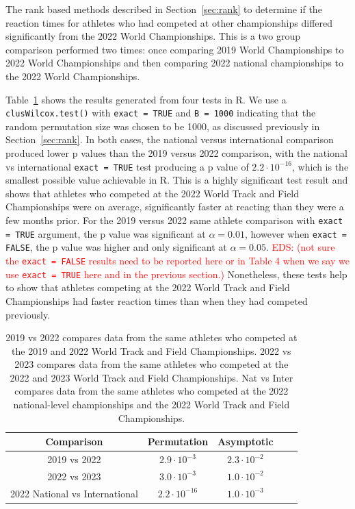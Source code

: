 \documentclass[12pt, letterpaper, titlepage]{article}
\newcommand{\eds}[1]{\textcolor{red}{EDS: (#1)}}
\begin{document}
The rank based methods described in Section~\ref{sec:rank}
to determine if the reaction times for athletes who had competed at other 
championships differed significantly from the 2022 World Championships.  This is
a two group comparison performed two times: once comparing 2019 World
Championships to 2022 World Championships and then comparing 2022 national
championships to the 2022 World Championships.



Table~\ref{tab:Clusrankresults} shows the results generated from four tests in R.
We use a \texttt{clusWilcox.test()} with \texttt{exact = TRUE} and 
\texttt{B = 1000} indicating that the random permutation size was chosen to be 
1000, as discussed previously in Section~\ref{sec:rank}.  
In both cases, the national versus international comparison
produced lower p values than the 2019 versus 2022 comparison, with the
national vs international \texttt{exact = TRUE} test producing a p value of 
$2.2\cdot10^{-16}$, which is the smallest possible value achievable in R.  This
is a highly significant test result and shows that athletes who competed at the
2022 World Track and Field Championships were on average, significantly faster
at reacting than they were a few months prior.  For the 2019 versus 2022
same athlete comparison with \texttt{exact = TRUE} argument, the p value was
significant at $\alpha = 0.01$, however when \texttt{exact = FALSE}, the p
value was higher and only significant at $\alpha = 0.05$. 
\eds{not sure the \texttt{exact = FALSE} results need to be reported here or in
Table 4 when we say we use \texttt{exact = TRUE} here and in the previous section.}
Nonetheless, these
tests help to show that athletes competing at the 2022 World Track and Field
Championships had faster reaction times than when they had competed previously.

\begin{table}
  \centering
  \caption{2019 vs 2022 compares data from the same athletes who competed at the
  2019 and 2022 World Track and Field Championships. 2022 vs 2023 compares data
  from the same athletes who competed at the 2022 and 2023 World Track and Field
  Championships. Nat vs Inter compares data from the same athletes who competed
  at the 2022 national-level championships and the 2022 World Track and Field
  Championships.}
  \begin{tabular}{c c c c c} 
   \toprule
   Comparison & Permutation & Asymptotic \\ 
   \midrule
   2019 vs 2022 & $2.9\cdot10^{-3}$ & $2.3\cdot10^{-2}$ \\
   2022 vs 2023 & $3.0\cdot10^{-3}$ & $1.0\cdot10^{-2}$ \\
   2022 National vs International & $2.2\cdot10^{-16}$ & $1.0\cdot10^{-3}$ \\
   \bottomrule
  \end{tabular}
  \label{tab:Clusrankresults}
\end{table}
\end{document}
